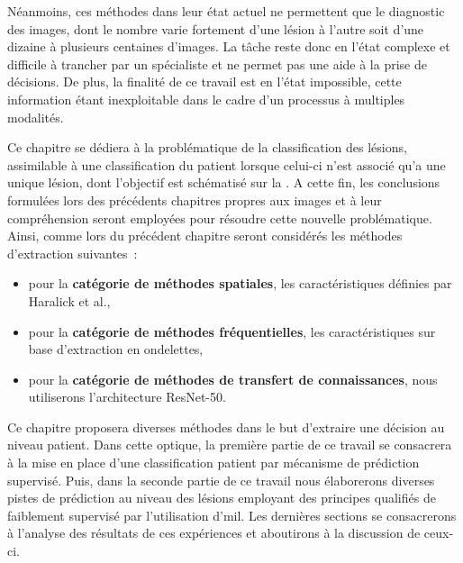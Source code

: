 Néanmoins, ces méthodes dans leur état actuel ne permettent que le diagnostic des images, dont le nombre varie fortement d'une lésion à l'autre soit d'une dizaine à plusieurs centaines d'images. La tâche reste donc en l'état complexe et difficile à trancher par un spécialiste et ne permet pas une aide à la prise de décisions. De plus, la finalité de ce travail est en l'état impossible, cette information étant inexploitable dans le cadre d'un processus à multiples modalités.\par

Ce chapitre se dédiera à la problématique de la classification des lésions, assimilable à une classification du patient lorsque celui-ci n'est associé qu'a une unique lésion, dont l'objectif est schématisé sur la . A cette fin, les conclusions formulées lors des précédents chapitres propres aux images et à leur compréhension seront employées pour résoudre cette nouvelle problématique. Ainsi, comme lors du précédent chapitre seront considérés les méthodes d'extraction suivantes~:
\begin{itemize}
    \item pour la \textbf{catégorie de méthodes spatiales}, les caractéristiques définies par Haralick et al.\cite{Haralick1973},
    \item pour la \textbf{catégorie de méthodes fréquentielles}, les caractéristiques sur base d'extraction en ondelettes,
    \item pour la \textbf{catégorie de méthodes de transfert de connaissances}, nous utiliserons l'architecture ResNet-50.
\end{itemize}\par\par

Ce chapitre proposera diverses méthodes dans le but d'extraire une décision au niveau patient. Dans cette optique, la première partie de ce travail se consacrera à la mise en place d'une classification patient par mécanisme de prédiction supervisé. Puis, dans la seconde partie de ce travail nous élaborerons diverses pistes de prédiction au niveau des lésions employant des principes qualifiés de faiblement supervisé par l'utilisation d'\gls{mil}. Les dernières sections se consacrerons à l'analyse des résultats de ces expériences et aboutirons à la discussion de ceux-ci.\par

